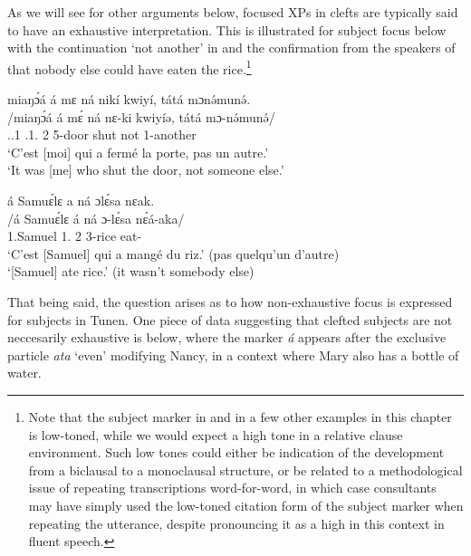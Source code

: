 \documentclass[output=paper,colorlinks,citecolor=brown
]{langscibook}
\begin{document}
\z

As we will see for other arguments below, focused XPs in clefts are typically said to have an exhaustive interpretation. This is illustrated for subject focus below with the continuation `not another' in  and the confirmation from the speakers of  that nobody else could have eaten the rice.\footnote{Note that the subject marker in  and in a few other examples in this chapter is low-toned, while we would expect a high tone in a relative clause environment. Such low tones could either be indication of the development from a biclausal to a monoclausal structure, or be related to a methodological issue of repeating transcriptions word-for-word, in which case consultants may have simply used the low-toned citation form of the subject marker when repeating the utterance, despite pronouncing it as a high in this context in fluent speech.}

\ea
\label{exhshutdoor}
\glll
{\db}miaŋɔ́á á mɛ ná nikí kwiyí, tátá mɔnə́munə́. \\
/miaŋɔ́á á mɛ́ ná nɛ-ki kwiyíə, tátá mɔ-nə́munə́/ \\
{\db}\PRO{}.\EMPH{}.1\SG{} \COP{} \SM{}.1\SG{}.\REL{} \PST{}2{} 5-door shut not 1-another \\
\glt
`C'est [moi]\textsubscript{\FOC{}} qui a fermé la porte, pas un autre.' \\ `It was [me]\textsubscript{\FOC{}} who shut the door, not someone else.' \jambox*{[EO 274] }

\z


\ea
\label{eatrice}
\glll
{\db}á	Samuɛ́lɛ	a ná	ɔlɛ́sa	nɛak. \\
/á	Samuɛ́lɛ	á ná	ɔ-lɛ́sa	nɛ́á-aka/ \\
{\db}\COP{}	1.Samuel	1\SM{}.\REL{} \PST{}2{}	3-rice	eat-\DUR{} \\
\glt
`C'est [Samuel]\textsubscript{\FOC{}} qui a mangé du riz.' (pas quelqu'un d'autre) \\ `[Samuel]\textsubscript{\FOC{}} ate rice.' (it wasn't somebody else) \jambox*{[EE + EB 1661] }

\z 

That being said, the question arises as to how non-exhaustive focus is expressed for subjects in Tunen. One piece of data suggesting that clefted subjects are not neccesarily exhaustive is  below, where the marker \textit{á} appears after the exclusive particle \textit{ata} `even' modifying Nancy, in a context where Mary also has a bottle of water.
\end{document}
